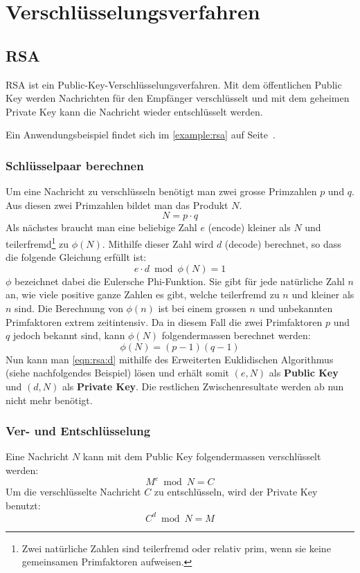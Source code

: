 \section{Verschlüsselungsverfahren}

\subsection{RSA}

RSA ist ein Public-Key-Verschlüsselungsverfahren. Mit dem öffentlichen Public
Key werden Nachrichten für den Empfänger verschlüsselt und mit dem geheimen
Private Key kann die Nachricht wieder entschlüsselt werden.

Ein Anwendungsbeispiel findet sich im \autoref{example:rsa} auf
Seite~\pageref{example:rsa}.

\subsubsection*{Schlüsselpaar berechnen}

Um eine Nachricht zu verschlüsseln benötigt man zwei grosse Primzahlen $p$ und
$q$. Aus diesen zwei Primzahlen bildet man das Produkt $N$.
\begin{equation}
	\label{eqn:rsa:N}
	N = p \cdot q
\end{equation}
Als nächstes braucht man eine beliebige Zahl $e$ (encode) kleiner als $N$ und
teilerfremd\footnote{Zwei natürliche Zahlen sind teilerfremd oder relativ prim,
wenn sie keine gemeinsamen Primfaktoren aufweisen.} zu $\phi(N)$. Mithilfe
dieser Zahl wird $d$ (decode) berechnet, so dass die folgende Gleichung erfüllt
ist:
\begin{equation}
	\label{eqn:rsa:d}
	e \cdot d \bmod \phi(N) = 1
\end{equation}
$\phi$ bezeichnet dabei die Eulersche Phi-Funktion. Sie gibt für jede natürliche
Zahl $n$ an, wie viele positive ganze Zahlen es gibt, welche teilerfremd zu $n$
und kleiner als $n$ sind. Die Berechnung von $\phi(n)$ ist bei einem grossen $n$
und unbekannten Primfaktoren extrem zeitintensiv. Da in diesem Fall die zwei
Primfaktoren $p$ und $q$ jedoch bekannt sind, kann $\phi(N)$ folgendermassen
berechnet werden:
\begin{equation}
	\phi(N) = (p-1)(q-1)
\end{equation}
Nun kann man \eqref{eqn:rsa:d} mithilfe des Erweiterten Euklidischen Algorithmus
(siehe nachfolgendes Beispiel) lösen und erhält somit $(e,N)$ als \textbf{Public
Key} und $(d,N)$ als \textbf{Private Key}. Die restlichen Zwischenresultate
werden ab nun nicht mehr benötigt.

\subsubsection*{Ver- und Entschlüsselung}

Eine Nachricht $N$ kann mit dem Public Key folgendermassen verschlüsselt werden:
\begin{equation}
	M^e \bmod N = C
\end{equation}
Um die verschlüsselte Nachricht $C$ zu entschlüsseln, wird der Private Key
benutzt:
\begin{equation}
	C^d \bmod N = M
\end{equation}
